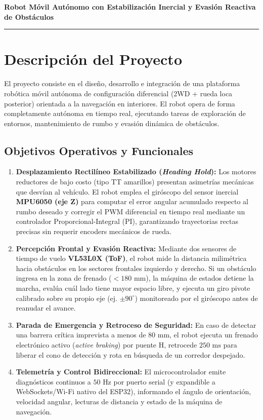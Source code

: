 \documentclass[11pt,a4paper]{article}
\begin{document}
\begin{center}
    {\LARGE \textbf{\color{primary} Robot Móvil Autónomo con Estabilización Inercial y Evasión Reactiva de Obstáculos}}\\[0.3cm]
    \rule{\textwidth}{1.2pt}
\end{center}

\vspace{0.3cm}

\section{Descripción del Proyecto}

El proyecto consiste en el diseño, desarrollo e integración de una plataforma robótica móvil autónoma de configuración diferencial (2WD + rueda loca posterior) orientada a la navegación en interiores. El robot opera de forma completamente autónoma en tiempo real, ejecutando tareas de exploración de entornos, mantenimiento de rumbo y evasión dinámica de obstáculos.

\subsection{Objetivos Operativos y Funcionales}
\begin{enumerate}
    \item \textbf{Desplazamiento Rectilíneo Estabilizado (\textit{Heading Hold}):} Los motores reductores de bajo costo (tipo TT amarillos) presentan asimetrías mecánicas que desvían al vehículo. El robot emplea el giróscopo del sensor inercial \textbf{MPU6050 (eje Z)} para computar el error angular acumulado respecto al rumbo deseado y corregir el PWM diferencial en tiempo real mediante un controlador Proporcional-Integral (PI), garantizando trayectorias rectas precisas sin requerir encoders mecánicos de rueda.
    \item \textbf{Percepción Frontal y Evasión Reactiva:} Mediante dos sensores de tiempo de vuelo \textbf{VL53L0X (ToF)}, el robot mide la distancia milimétrica hacia obstáculos en los sectores frontales izquierdo y derecho. Si un obstáculo ingresa en la zona de frenado ($< 180\text{ mm}$), la máquina de estados detiene la marcha, evalúa cuál lado tiene mayor espacio libre, y ejecuta un giro pivote calibrado sobre su propio eje (ej. $\pm 90^\circ$) monitoreado por el giróscopo antes de reanudar el avance.
    \item \textbf{Parada de Emergencia y Retroceso de Seguridad:} En caso de detectar una barrera crítica imprevista a menos de $80\text{ mm}$, el robot ejecuta un frenado electrónico activo (\textit{active braking}) por puente H, retrocede $250\text{ ms}$ para liberar el cono de detección y rota en búsqueda de un corredor despejado.
    \item \textbf{Telemetría y Control Bidireccional:} El microcontrolador emite diagnósticos continuos a $50\text{ Hz}$ por puerto serial (y expandible a WebSockets/Wi-Fi nativo del ESP32), informando el ángulo de orientación, velocidad angular, lecturas de distancia y estado de la máquina de navegación.
\end{enumerate}
\end{document}
